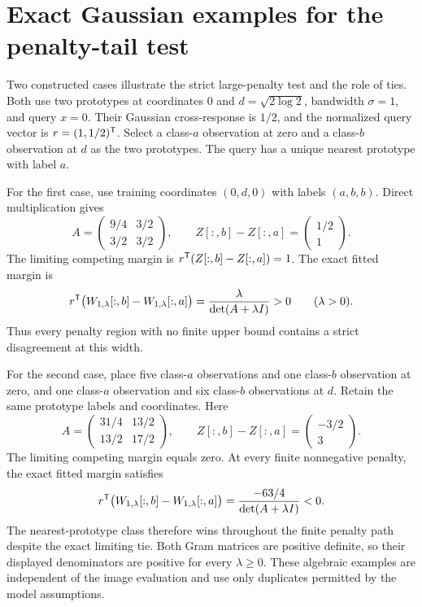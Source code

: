 \section{Exact Gaussian examples for the penalty-tail test}
\label{app:exact-ridge-examples}
Two constructed cases illustrate the strict large-penalty test and the role
of ties. Both use two prototypes at coordinates $0$ and
$d=\sqrt{2\log 2}$, bandwidth $\sigma=1$, and query $x=0$. Their Gaussian
cross-response is $1/2$, and the normalized query vector is
$r=(1,1/2)^{\mathsf{T}}$. Select a class-$a$ observation at zero and a class-$b$
observation at $d$ as the two prototypes. The query has a unique nearest
prototype with label $a$.

For the first case, use training coordinates $(0,d,0)$ with labels $(a,b,b)$.
Direct multiplication gives
\[
 A=\begin{pmatrix}9/4&3/2\\3/2&3/2\end{pmatrix},
 \qquad Z[:,b]-Z[:,a]=\begin{pmatrix}1/2\\1\end{pmatrix}.
\]
The limiting competing margin is
$r^{\mathsf{T}}(Z[:,b]-Z[:,a])=1$. The exact fitted margin is
\[
 r^{\mathsf{T}}\bigl(W_{1,\lambda}[:,b]-W_{1,\lambda}[:,a]\bigr)
 =\frac{\lambda}{\det(A+\lambda I)}>0
 \qquad(\lambda>0).
\]
Thus every penalty region with no finite upper bound contains a strict
disagreement at this width.

For the second case, place five class-$a$ observations and one class-$b$
observation at zero, and one class-$a$ observation and six class-$b$
observations at $d$. Retain the same prototype labels and coordinates.
Here
\[
 A=\begin{pmatrix}31/4&13/2\\13/2&17/2\end{pmatrix},
 \qquad Z[:,b]-Z[:,a]=\begin{pmatrix}-3/2\\3\end{pmatrix}.
\]
The limiting competing margin equals zero. At every finite nonnegative
penalty, the exact fitted margin satisfies
\[
 r^{\mathsf{T}}\bigl(W_{1,\lambda}[:,b]-W_{1,\lambda}[:,a]\bigr)
 =\frac{-63/4}{\det(A+\lambda I)}<0.
\]
The nearest-prototype class therefore wins throughout the finite penalty
path despite the exact limiting tie. Both Gram matrices are positive
definite, so their displayed denominators are positive for every
$\lambda\geq0$. These algebraic examples are independent of the image
evaluation and use only duplicates permitted by the model assumptions.
